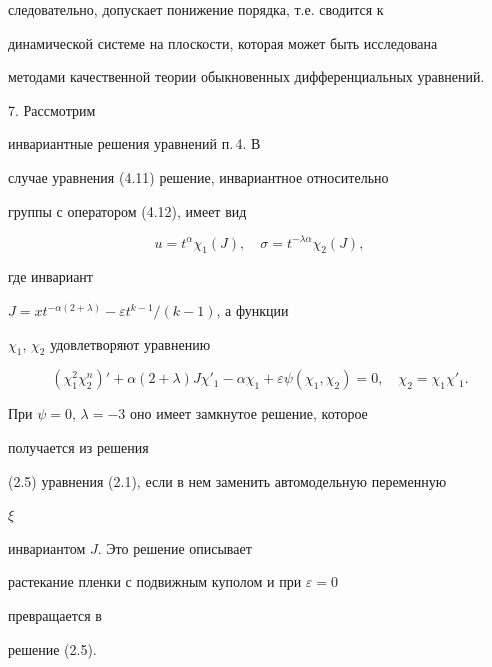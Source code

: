 следовательно, допускает понижение порядка, т.е. сводится к


динамической системе на плоскости, которая может быть исследована


методами качественной теории обыкновенных дифференциальных уравнений.


\medskip


\addtocounter{section}{1}


\addtocounter{equation}{-5}





7. Рассмотрим


инвариантные решения уравнений п.\,4. В


случае уравнения (4.11)  решение,  инвариантное  относительно


группы с оператором (4.12), имеет вид


\begin{equation}


u=t^\alpha\chi_1(J),\quad \sigma=t^{-\lambda\alpha}\chi_2(J),


\end{equation}


где инвариант


$J=xt^{-\alpha(2+\lambda)}-\varepsilon t^{k-1}/(k-1)$, а функции


$\chi_1$, $\chi_2$ удовлетворяют уравнению


\begin{equation}


(\chi^2_1\chi^n_2)'+\alpha(2+\lambda)J\chi'_1-


\alpha\chi_1+\varepsilon\psi(\chi_1,\chi_2)=0,\quad


\chi_2=\chi_1\chi'_1.


\end{equation}


При $\psi=0$, $\lambda=-3$ оно имеет замкнутое решение, которое


получается из решения


(2.5) уравнения (2.1),  если в нем заменить автомодельную переменную


$\xi$


инвариантом  $J$. Это решение описывает


растекание пленки с подвижным куполом и при $\varepsilon=0$


превращается в


решение (2.5).





